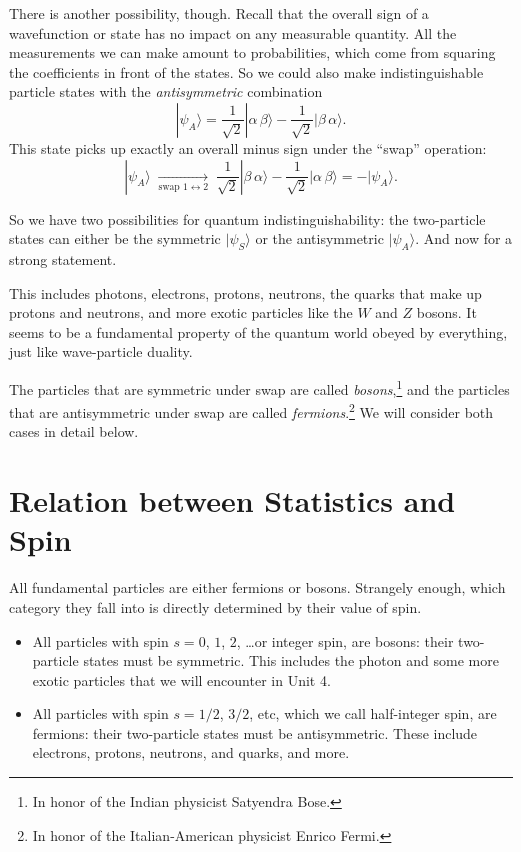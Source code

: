 There is another possibility, though.  Recall that the overall sign of
a wavefunction or state has no impact on any measurable quantity.
All the measurements we can make amount to probabilities, which come
from squaring the coefficients in front of the states.  So we could
also make indistinguishable particle states with the
\textit{antisymmetric} combination
\begin{equation}
 |\psi_A\rangle =  \frac{1}{\sqrt 2} |\alpha\,\beta\rangle
 - \frac{1}{\sqrt 2}|\beta\,\alpha\rangle.
\end{equation}
This state picks up exactly an overall minus sign under the ``swap''
operation:
\begin{equation}
|\psi_A\rangle 
   \;\xrightarrow[\text{swap } 1\leftrightarrow 2]{}  \;
  \frac{1}{\sqrt 2} |\beta\,\alpha\rangle - \frac{1}{\sqrt 2}
 |\alpha\,\beta\rangle
 = -|\psi_A\rangle.
\end{equation}

So we have two possibilities for quantum indistinguishability:
the two-particle states can either be the symmetric $|\psi_S\rangle$
or the antisymmetric $|\psi_A\rangle$.  And now for a strong statement.


\noindent This includes photons, electrons, protons, neutrons, the
quarks that make up protons and neutrons, and more exotic particles
like the $W$ and $Z$ bosons.  It seems to be a fundamental property of
the quantum world obeyed by everything, just like wave-particle
duality.

The particles that are symmetric under swap are called
\textit{bosons},\footnote{In honor of the Indian physicist Satyendra
  Bose.} and the particles that are antisymmetric under swap are
called \textit{fermions}.\footnote{In honor of the Italian-American
  physicist Enrico Fermi.}  We will consider both cases in detail
below.


\section{Relation between Statistics and Spin}

All fundamental particles are either fermions or bosons.  Strangely
enough, which category they fall into is directly determined by their
value of spin.

\begin{itemize}
\item All particles with spin $s=0$, $1$, $2$, \dots or integer spin,
  are bosons: their two-particle states must be symmetric.  This
  includes the photon and some more exotic particles that we will
  encounter in Unit 4.

\item All particles with spin $s=1/2$, $3/2$, etc, which we call
  half-integer spin, are fermions: their two-particle states must be
  antisymmetric.  These include electrons, protons, neutrons, and
  quarks, and more.
\end{itemize}

